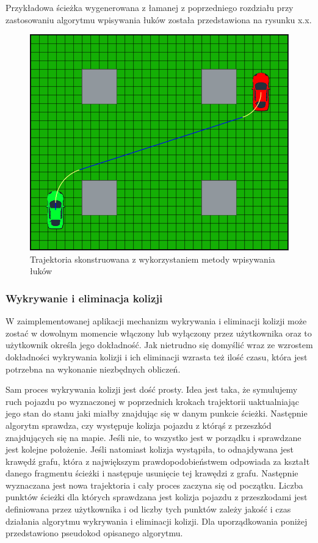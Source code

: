 \documentclass[a4paper,11pt,twoside]{report}
\theoremstyle{definition}
\begin{document}
Przykładowa ścieżka wygenerowana z łamanej z poprzedniego rozdziału przy zastosowaniu algorytmu wpisywania łuków została przedstawiona na rysunku x.x.

\begin{figure}[h!]
\centering
\includegraphics[scale=0.4]{finalPathArcs}
\caption[Trajektoria skonstruowana z wykorzystaniem metody wpisywania łuków]{Trajektoria skonstruowana z wykorzystaniem metody wpisywania łuków}
\end{figure}

\subsubsection{Wykrywanie i eliminacja kolizji}

W zaimplementowanej aplikacji mechanizm wykrywania i eliminacji kolizji może zostać w dowolnym momencie włączony lub wyłączony przez użytkownika oraz to użytkownik określa jego dokładność. Jak nietrudno się domyślić wraz ze wzrostem dokładności wykrywania kolizji i ich eliminacji wzrasta też ilość czasu, która jest potrzebna na wykonanie niezbędnych obliczeń. 

Sam proces wykrywania kolizji jest dość prosty. Idea jest taka, że symulujemy ruch pojazdu po wyznaczonej w poprzednich krokach trajektorii uaktualniając jego stan do stanu jaki miałby znajdując się w danym punkcie ścieżki. Następnie algorytm sprawdza, czy występuje kolizja pojazdu z którąś z przeszkód znajdujących się na mapie. Jeśli nie, to wszystko jest w porządku i sprawdzane jest kolejne położenie. Jeśli natomiast kolizja wystąpiła, to odnajdywana jest krawędź grafu, która z największym prawdopodobieństwem odpowiada za kształt danego fragmentu ścieżki i następuje usunięcie tej krawędzi z grafu. Następnie wyznaczana jest nowa trajektoria i cały proces zaczyna się od początku. Liczba punktów ścieżki dla których sprawdzana jest kolizja pojazdu z przeszkodami jest definiowana przez użytkownika i od liczby tych punktów zależy jakość i czas działania algorytmu wykrywania i eliminacji kolizji. Dla uporządkowania poniżej przedstawiono pseudokod opisanego algorytmu.
\end{document}
